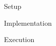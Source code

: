 \begin{frame}{Setup}

\end{frame}

\begin{frame}{Implementation}

\end{frame}

\begin{frame}{Execution}

\end{frame}
